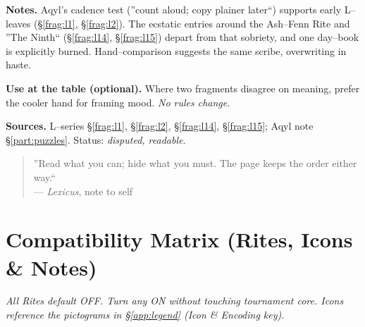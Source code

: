 \documentclass[11pt]{article}
\numberwithin{equation}{section} %
\theoremstyle{plain} %
\theoremstyle{definition} %
\theoremstyle{remark} %
\begin{document}
\medskip
\noindent\textbf{Notes.} Aqyl's cadence test (''count aloud; copy plainer later``) supports early L--leaves (\S\ref{frag:l1}, \S\ref{frag:l2}). The ecstatic entries around the Ash--Fenn Rite and ''The Ninth`` (\S\ref{frag:l14}, \S\ref{frag:l15}) depart from that sobriety, and one day--book is explicitly burned. Hand--comparison suggests the same scribe, overwriting in haste.

\medskip
\noindent\textbf{Use at the table (optional).} Where two fragments disagree on meaning, prefer the cooler hand for framing mood. \emph{No rules change.}

\medskip
\noindent\textbf{Sources.} L--series \S\ref{frag:l1}, \S\ref{frag:l2}, \S\ref{frag:l14}, \S\ref{frag:l15}; Aqyl note \S\ref{part:puzzles}. Status: \emph{disputed, readable}.


\begin{quote}\small
''Read what you can; hide what you must. The page keeps the order either way.``\\
\hfill --- \textit{Lexicus}, note to self
\end{quote}
\clearpage
\appendix

\section{Compatibility Matrix (Rites, Icons \& Notes)}
\label{app:compat}

\noindent\textit{All Rites default \textsc{OFF}. Turn any \textsc{ON} without touching tournament core. Icons reference the pictograms in \S\ref{app:legend} (Icon \& Encoding key).}
\end{document}
